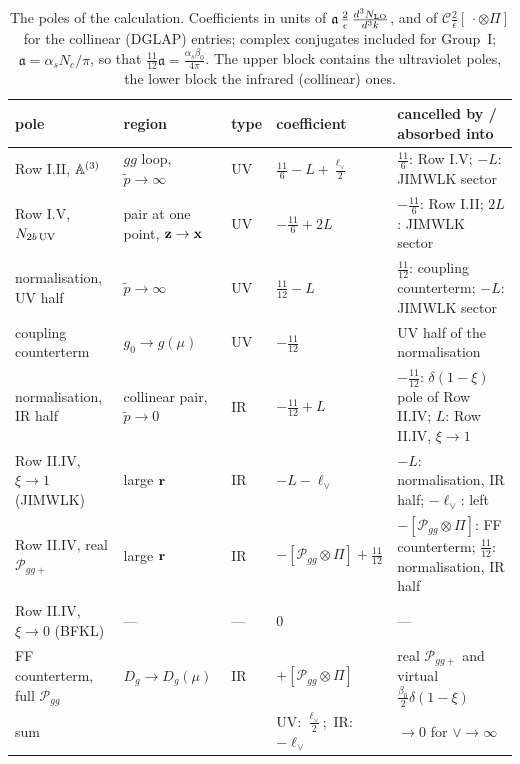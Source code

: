 \begin{table}[t]
\centering
\renewcommand{\arraystretch}{1.25}
\footnotesize
\begin{tabular}{@{}p{3.1cm}p{2.6cm}p{0.6cm}p{2.4cm}p{4.0cm}@{}}
\toprule
pole & region & type & coefficient & cancelled by / absorbed into\\
\midrule
Row I.II, $\mathbb{A}^{(3)}$ & $gg$ loop, $\tilde p\to\infty$ & UV & $\frac{11}{6}-L+\frac{\ell_\vee}{2}$ & $\frac{11}{6}$: Row I.V; $-L$: JIMWLK sector\\
Row I.V, $N_{2b\,\rm UV}$ & pair at one point, $\mathbf{z}\to\mathbf{x}$ & UV & $-\frac{11}{6}+2L$ & $-\frac{11}{6}$: Row I.II; $2L$: JIMWLK sector\\
normalisation, UV half & $\tilde p\to\infty$ & UV & $\frac{11}{12}-L$ & $\frac{11}{12}$: coupling counterterm; $-L$: JIMWLK sector\\
coupling counterterm & $g_0\to g(\mu)$ & UV & $-\frac{11}{12}$ & UV half of the normalisation\\
\midrule
normalisation, IR half & collinear pair, $\tilde p\to0$ & IR & $-\frac{11}{12}+L$ & $-\frac{11}{12}$: $\delta(1-\xi)$ pole of Row II.IV; $L$: Row II.IV, $\xi\to1$\\
Row II.IV, $\xi\to1$ (JIMWLK) & large $\mathbf{r}$ & IR & $-L-\ell_\vee$ & $-L$: normalisation, IR half; $-\ell_\vee$: left\\
Row II.IV, real $\mathcal P_{gg+}$ & large $\mathbf{r}$ & IR & $-[\mathcal P_{gg}\otimes\Pi]+\frac{11}{12}$ & $-[\mathcal P_{gg}\otimes\Pi]$: FF counterterm; $\frac{11}{12}$: normalisation, IR half\\
Row II.IV, $\xi\to0$ (BFKL) & --- & --- & $0$ & ---\\
FF counterterm, full $\mathcal P_{gg}$ & $D_g\to D_g(\mu)$ & IR & $+[\mathcal P_{gg}\otimes\Pi]$ & real $\mathcal P_{gg+}$ and virtual $\frac{\beta_0}{2}\delta(1-\xi)$\\
\midrule
sum & & & UV: $\frac{\ell_\vee}{2}$;\ IR: $-\ell_\vee$ & $\to0$ for $\vee\to\infty$\\
\bottomrule
\end{tabular}
\caption{The poles of the calculation. Coefficients in units of $\mathfrak a\,\frac2\epsilon\,\frac{d^3N_{\rm LO}}{d^3k}$, and of $\mathcal C\frac2\epsilon[\,\cdot\otimes\Pi]$ for the collinear (DGLAP) entries; complex conjugates included for Group~I; $\mathfrak a=\alpha_sN_c/\pi$, so that $\frac{11}{12}\mathfrak a=\frac{\alpha_s\beta_0}{4\pi}$. The upper block contains the ultraviolet poles, the lower block the infrared (collinear) ones.}
\label{tab:poles}
\end{table}


